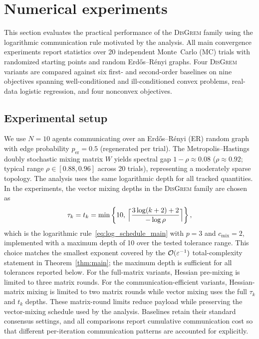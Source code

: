 \documentclass[review,onefignum,onetabnum]{siamart171218}
\begin{document}
	
	
	
	\section{Numerical experiments}\label{sec:experiments}
	
	This section evaluates the practical performance of the
	\textsc{DisGrem} family using the logarithmic communication rule
	motivated by the analysis.
	All main convergence experiments report statistics over
	20 independent Monte~Carlo (MC) trials with
	randomized starting points and random Erd\H{o}s--R\'{e}nyi graphs.
	Four \textsc{DisGrem} variants are compared against six first- and
	second-order baselines on nine objectives spanning well-conditioned
	and ill-conditioned convex problems, real-data logistic regression,
	and four nonconvex objectives.
	
	\subsection{Experimental setup}\label{ssec:setup}
	
	We use $N{=}10$ agents communicating over an Erd\H{o}s--R\'{e}nyi (ER) random graph
	with edge probability $p_{\mathrm{er}}{=}0.5$ (regenerated per trial).
	The Metropolis--Hastings doubly stochastic mixing matrix $W$ yields
	spectral gap $1{-}\rho\approx 0.08$
	($\rho\approx 0.92$; typical range $\rho\in[0.88,0.96]$ across 20 trials),
	representing a moderately sparse topology.
	The analysis uses the same logarithmic depth for all tracked quantities.
	In the experiments, the vector mixing depths in
	the \textsc{DisGrem} family are chosen as
	\[
	\tau_k=t_k=
	\min\left\{10,\,
	\Bigl\lceil \frac{3\log(k+2)+2}{-\log\rho}\Bigr\rceil
	\right\},
	\]
	which is the logarithmic rule~\eqref{eq:log_schedule_main} with
	$p=3$ and $c_{\mathrm{mix}}=2$, implemented with a maximum depth of
	10 over the tested tolerance range.
	This choice matches the smallest exponent covered by the
	$\mathcal{O}(\varepsilon^{-1})$ total-complexity statement in
	Theorem~\ref{thm:main}; the maximum depth is sufficient for all
	tolerances reported below.
	For the full-matrix variants, Hessian pre-mixing is limited to three
	matrix rounds. For the communication-efficient variants, Hessian-matrix
	mixing is limited to two matrix rounds while vector mixing uses the
	full $\tau_k$ and $t_k$ depths. These matrix-round limits reduce
	payload while preserving the vector-mixing schedule used by the
	analysis.
	Baselines retain their standard consensus settings, and all comparisons
	report cumulative communication cost so that different per-iteration
	communication patterns are accounted for explicitly.
	
\end{document}
